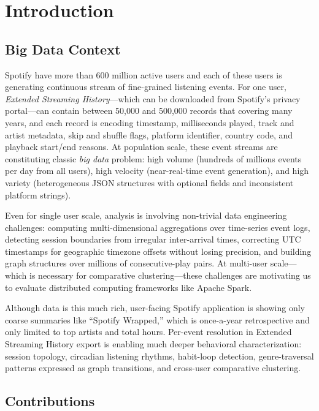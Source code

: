 \documentclass[conference]{IEEEtran}
\begin{document}
\section{Introduction}

\subsection{Big Data Context}

Spotify have more than 600 million active users and each of these users is generating continuous stream of fine-grained listening events. For one user, \emph{Extended Streaming History}---which can be downloaded from Spotify's privacy portal---can contain between 50,000 and 500,000 records that covering many years, and each record is encoding timestamp, milliseconds played, track and artist metadata, skip and shuffle flags, platform identifier, country code, and playback start/end reasons. At population scale, these event streams are constituting classic \emph{big data} problem: high volume (hundreds of millions events per day from all users), high velocity (near-real-time event generation), and high variety (heterogeneous JSON structures with optional fields and inconsistent platform strings).

Even for single user scale, analysis is involving non-trivial data engineering challenges: computing multi-dimensional aggregations over time-series event logs, detecting session boundaries from irregular inter-arrival times, correcting UTC timestamps for geographic timezone offsets without losing precision, and building graph structures over millions of consecutive-play pairs. At multi-user scale---which is necessary for comparative clustering---these challenges are motivating us to evaluate distributed computing frameworks like Apache Spark.

Although data is this much rich, user-facing Spotify application is showing only coarse summaries like ``Spotify Wrapped,'' which is once-a-year retrospective and only limited to top artists and total hours. Per-event resolution in Extended Streaming History export is enabling much deeper behavioral characterization: session topology, circadian listening rhythms, habit-loop detection, genre-traversal patterns expressed as graph transitions, and cross-user comparative clustering.

\subsection{Contributions}
\end{document}
